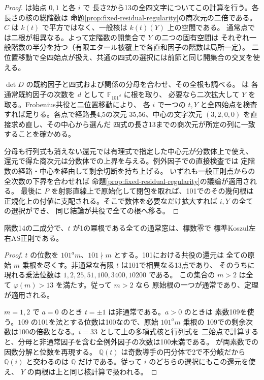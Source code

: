 \begin{proof}
 は始点 $0,1$ と各 $i$ で
長さ2から13の全四文字についてこの計算を行う。各長さの核の総階数は
命題\ref{prop:fixed-residual-regularity}の商次元の二倍である。
$C$ は $k(t)$ で平方ではなく、一般核は $k(t)(Y)$ 上の空間である。
通常点では二根が相異なる。よって定階数の開集合で $Y$ の二つの固有空間は
それぞれ一般階数の半分を持つ（有限エタール被覆上で各直和因子の階数は局所一定）。
二位置移動で全四始点が扱え、共通の四式の選択には前節と同じ開集合の交叉を使える。

$\det D$ の既約因子と四式および関係の分母を合わせ、その全根も調べる。
 は
各通常既約因子の次数を $d$ として $\mathbb F_{101^d}$ に根を取り、
必要なら二次拡大して $Y$ を取る。Frobenius共役と二位置移動により、
各 $i$ で一つの $t,Y$ と全四始点を検査すれば足りる。各点で経路長4,5の次元
35,56、中心の文字次元 $(3,2,0,0)$ を直接求め直し、その中心から選んだ
四式の長さ13までの商次元が所定の列に一致することを確かめる。

分母も行列式も消えない還元では有理式で指定した中心元が分数体上で使え、
還元で得た商次元は分数体での上界を与える。例外因子での直接検査では
定階数の経路・中心を経由して剰余切断を持ち上げる。
いずれも一般正則点からの全次数の下界を合わせれば
命題\ref{prop:fixed-residual-regularity}の議論が適用される。
最後に $P$ を射影直線上で原始化して閉包を取れば、101でのその幾何根は
正規化上の付値に支配される。そこで数体を必要なだけ拡大すれば $i,Y$ の全ての選択ができ、
同じ結論が共役で全ての根へ移る。
\end{proof}

\begin{corollary}\label{cor:rank-fourteen-cyclotomic}
階数14の二成分で、$t$ が1の冪根である全ての通常窓は、標数零で
標準Koszul左右AS正則である。
\end{corollary}
\begin{proof}
$t$ の位数を $101^a m$、$101\nmid m$ とする。101における共役の還元は
全ての原始 $m$ 乗根を尽くす。非通常な有限 $t$ は101で相異なる13点であり、
そのうちに現れる乗法位数は $1,2,25,51,100,3400,10200$ である。
この集合の $m>2$ は全て $\varphi(m)>13$ を満たす。従って $m>2$ なら
原始根の一つが通常であり、定理が適用される。

$m=1,2$ で $a=0$ のとき $t=\pm1$ は非通常である。$a>0$ のときは
素数109を使う。$109$ の101を法とする位数は100なので、原始 $101^a m$ 乗根の
109での剰余次数は100の倍数となる。$i=33$ として上の多項式核と行列式を
二始点で計算すると、分母と非通常因子を含む全例外因子の次数は100未満である。
 が両素数での因数分解と位数を再現する。
$\mathbb Q(t)$ は奇数導手の円分体で2で不分岐だから $\mathbb Q(i)$ と交わるのは
$\mathbb Q$ だけである。従って $i$ のどちらの選択にもこの還元を使え、
$Y$ の両根は上と同じ核計算で扱われる。
\end{proof}
